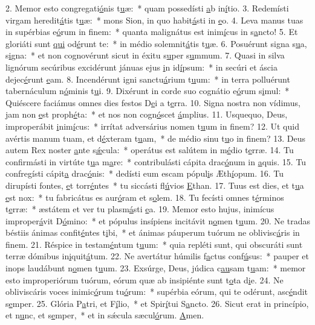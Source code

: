 2. Memor esto congregati\uline{ó}nis t\uline{u}æ:~* quam possedísti \uline{a}b in\uline{í}tio.
3. Redemísti virgam heredit\uline{á}tis t\uline{u}æ:~* mons Sion, in quo habit\uline{á}sti in \uline{e}o.
4. Leva manus tuas in supérbias e\uline{ó}rum in f\uline{i}nem:~* quanta malignátus est inim\uline{í}cus in s\uline{a}ncto!
5. Et gloriáti sunt \uline{qui} od\uline{é}runt te:~* in médio solemnit\uline{á}tis t\uline{u}æ.
6. Posuérunt signa s\uline{u}a, s\uline{i}gna:~* et non cognovérunt sicut in éxitu s\uline{u}per s\uline{u}mmum.
7. Quasi in silva lignórum secúribus excidérunt jánuas ejus \uline{i}n id\uline{í}psum:~* in secúri et áscia dejec\uline{é}runt \uline{e}am.
8. Incendérunt igni sanctu\uline{á}rium t\uline{u}um:~* in terra polluérunt tabernáculum n\uline{ó}minis t\uline{u}i.
9. Dixérunt in corde suo cognátio e\uline{ó}rum s\uline{i}mul:~* Quiéscere faciámus omnes dies festos D\uline{e}i a t\uline{e}rra.
10. Signa nostra non vídimus, jam non \uline{e}st proph\uline{é}ta:~* et nos non cogn\uline{ó}scet \uline{á}mplius.
11. Usquequo, Deus, improperábit \uline{i}nim\uline{í}cus:~* irrítat adversárius nomen t\uline{u}um in f\uline{i}nem?
12. Ut quid avértis manum tuam, et d\uline{é}xteram t\uline{u}am,~* de médio sinu t\uline{u}o in f\uline{i}nem?
13. Deus autem Rex noster \uline{a}nte s\uline{ǽ}cula:~* operátus est salútem in m\uline{é}dio t\uline{e}rræ.
14. Tu confirmásti in virtúte t\uline{u}a m\uline{a}re:~* contribulásti cápita drac\uline{ó}num in \uline{a}quis.
15. Tu confregísti cápit\uline{a} drac\uline{ó}nis:~* dedísti eum escam pópul\uline{i}s Æth\uline{í}opum.
16. Tu dirupísti fontes, \uline{e}t torr\uline{é}ntes~* tu siccásti fl\uline{ú}vios \uline{E}than.
17. Tuus est dies, et t\uline{u}a \uline{e}st nox:~* tu fabricátus es aur\uline{ó}ram et s\uline{o}lem.
18. Tu fecísti omnes t\uline{é}rminos t\uline{e}rræ:~* æstátem et ver tu plasm\uline{á}sti \uline{e}a.
19. Memor esto hujus, inimícus improper\uline{á}vit D\uline{ó}mino:~* et pópulus insípiens incitávit n\uline{o}men t\uline{u}um.
20. Ne tradas béstiis ánimas confit\uline{é}ntes t\uline{i}bi,~* et ánimas páuperum tuórum ne oblivisc\uline{á}ris in f\uline{i}nem.
21. Réspice in testam\uline{é}ntum t\uline{u}um:~* quia repléti sunt, qui obscuráti sunt terræ dómibus in\uline{i}quit\uline{á}tum.
22. Ne avertátur húmilis f\uline{a}ctus conf\uline{ú}sus:~* pauper et inops laudábunt n\uline{o}men t\uline{u}um.
23. Exsúrge, Deus, júdica c\uline{au}sam t\uline{u}am:~* memor esto improperiórum tuórum, eórum quæ ab insipiénte sunt t\uline{o}ta d\uline{i}e.
24. Ne obliviscáris voces inimic\uline{ó}rum tu\uline{ó}rum:~* supérbia eórum, qui te odérunt, asc\uline{é}ndit s\uline{e}mper.
25. Glória P\uline{a}tri, et F\uline{í}lio,~* et Spir\uline{í}tui S\uline{a}ncto.
26. Sicut erat in princípio, et n\uline{u}nc, et s\uline{e}mper,~* et in sǽcula sæcul\uline{ó}rum. \uline{A}men.
